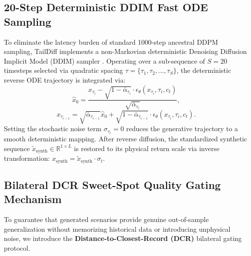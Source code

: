 \documentclass[preprint,12pt,authoryear]{elsarticle}
\begin{document}
\subsection{20-Step Deterministic DDIM Fast ODE Sampling}
To eliminate the latency burden of standard 1000-step ancestral DDPM sampling, TailDiff implements a non-Markovian deterministic Denoising Diffusion Implicit Model (DDIM) sampler \citep{song2021denoising}. Operating over a sub-sequence of $S = 20$ timesteps selected via quadratic spacing $\tau = \{\tau_1, \tau_2, \dots, \tau_S\}$, the deterministic reverse ODE trajectory is integrated via:
\begin{equation}
    \hat{x}_0 = \frac{x_{\tau_i} - \sqrt{1 - \bar{\alpha}_{\tau_i}} \cdot \epsilon_\theta(x_{\tau_i}, \tau_i, c_t)}{\sqrt{\bar{\alpha}_{\tau_i}}},
\end{equation}
\begin{equation}
    x_{\tau_{i-1}} = \sqrt{\bar{\alpha}_{\tau_{i-1}}} \hat{x}_0 + \sqrt{1 - \bar{\alpha}_{\tau_{i-1}}} \cdot \epsilon_\theta(x_{\tau_i}, \tau_i, c_t).
\end{equation}
Setting the stochastic noise term $\sigma_{\tau_i} = 0$ reduces the generative trajectory to a smooth deterministic mapping. After reverse diffusion, the standardized synthetic sequence $\tilde{x}_{\text{synth}} \in \mathbb{R}^{1 \times L}$ is restored to its physical return scale via inverse transformation: $x_{\text{synth}} = \tilde{x}_{\text{synth}} \cdot \sigma_t$.

\subsection{Bilateral DCR Sweet-Spot Quality Gating Mechanism}
To guarantee that generated scenarios provide genuine out-of-sample generalization without memorizing historical data or introducing unphysical noise, we introduce the \textbf{Distance-to-Closest-Record (DCR)} bilateral gating protocol. 
\end{document}
